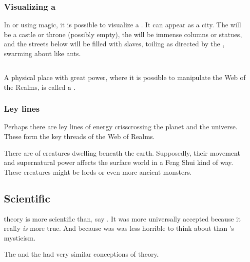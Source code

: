 \subsubsection{Visualizing a \matrixx}
In  or using magic, it is possible to visualize a \matrixx{}. It can appear as a city. The \apex{} will be a castle or throne (possibly empty), the \vertices{} will be immense columns or statues, and the streets below will be filled with slaves, toiling as directed by the \vertices, swarming about like ants. 










\subsection{\Nexus}
\index{\nexus}
A physical place with great power, where it is possible to manipulate the Web of the Realms, is called a \nexus. 





\subsubsection{Ley lines}
Perhaps there are ley lines of \nexus{} energy crisscrossing the planet and the universe. These form the key threads of the Web of Realms. 

There are  of creatures dwelling beneath the earth. Supposedly, their movement and supernatural power affects the surface world in a Feng Shui kind of way. These creatures might be \trueophidian{} lords or even more ancient monsters. 









\subsection{Scientific}
\Matrix theory is more scientific than, say . 
It was more universally accepted because it really \emph{is} more true. 
And because was was less horrible to think about than \Sethicus's \xs mysticism. 

The \dragons and the \resphain had very similar conceptions of \matrix theory. 









